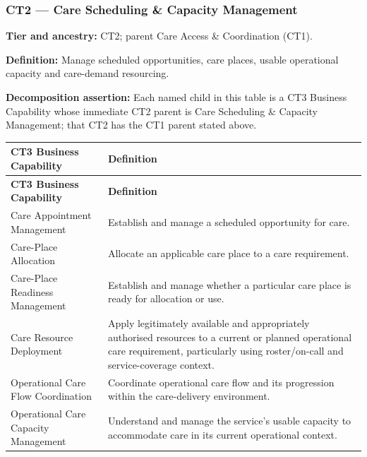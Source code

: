 \label{rad:business:386}
\subsubsection*{CT2 — Care Scheduling \& Capacity Management}
\label{rad:business:388}

\textbf{Tier and ancestry:} CT2; parent Care Access \& Coordination (CT1).

\label{rad:business:390}

\textbf{Definition:} Manage scheduled opportunities, care places, usable operational capacity and care-demand resourcing.

\label{rad:business:392}

\textbf{Decomposition assertion:} Each named child in this table is a CT3 Business Capability whose immediate CT2 parent is Care Scheduling \& Capacity Management; that CT2 has the CT1 parent stated above.

\label{rad:business:394}
\begingroup\small\setlength{\TableWidth}{\dimexpr\linewidth-4\tabcolsep-3\arrayrulewidth\relax}
\begin{longtable}{|>{\raggedright\arraybackslash}p{0.35\TableWidth}|>{\raggedright\arraybackslash}p{0.65\TableWidth}|}
\hline\rowcolor{TableHead}\textbf{CT3 Business Capability} & \textbf{Definition}\\\hline\endfirsthead
\hline\rowcolor{TableHead}\textbf{CT3 Business Capability} & \textbf{Definition}\\\hline\endhead
\hline\endfoot
Care Appointment Management & Establish and manage a scheduled opportunity for care.\\\hline
Care-Place Allocation & Allocate an applicable care place to a care requirement.\\\hline
Care-Place Readiness Management & Establish and manage whether a particular care place is ready for allocation or use.\\\hline
Care Resource Deployment & Apply legitimately available and appropriately authorised resources to a current or planned operational care requirement, particularly using roster/\allowbreak{}on-call and service-coverage context.\\\hline
Operational Care Flow Coordination & Coordinate operational care flow and its progression within the care-delivery environment.\\\hline
Operational Care Capacity Management & Understand and manage the service’s usable capacity to accommodate care in its current operational context.\\\hline
\end{longtable}\endgroup
{}\label{rad:business:403}

